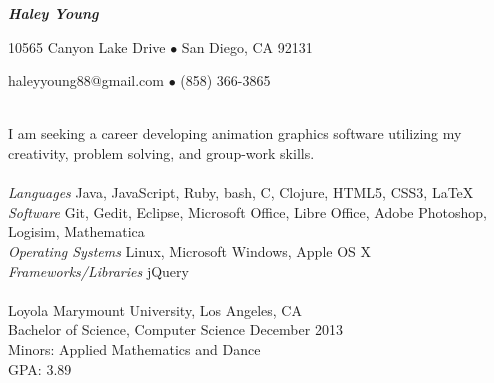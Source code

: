 \documentclass[11pt]{article}
\begin{document}
\centerline{{\Large \bf \emph{Haley Young}}}
\centerline{10565 Canyon Lake Drive $\bullet$ San Diego, CA 92131}
\centerline{haleyyoung88@gmail.com $\bullet$ (858) 366-3865}
\vspace{7 mm}

\vspace{3mm}\\
\indent I am seeking a career developing animation graphics software utilizing my creativity, problem solving, and
\indent group-work skills.\\

\vspace{1.5mm}\\
\indent \emph{Languages} \hfill Java, JavaScript, Ruby, bash, C, Clojure, HTML5, CSS3, LaTeX\\
\indent \emph{Software} \hfill  Git, Gedit, Eclipse, Microsoft Office, Libre Office,
\hfill Adobe Photoshop, Logisim, Mathematica\\
\indent \emph{Operating Systems} \hfill Linux, Microsoft Windows, Apple OS X\\
\indent \emph{Frameworks/Libraries} \hfill jQuery\\

\vspace{1.5mm}\\
\indent Loyola Marymount University, Los Angeles, CA\\
\indent Bachelor of Science, Computer Science \hfill December 2013\\
\indent Minors: Applied Mathematics and Dance\\
\indent GPA: 3.89\\
\end{document}
